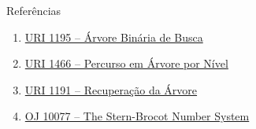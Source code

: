 \begin{frame}[fragile]{Referências}

    \begin{enumerate}
        \item \href{https://www.urionlinejudge.com.br/judge/pt/problems/view/1195}{URI 1195 -- Árvore Binária de Busca}

        \item \href{https://www.urionlinejudge.com.br/judge/pt/problems/view/1466}{URI 1466 -- Percurso em Árvore por Nível}

        \item \href{https://www.urionlinejudge.com.br/judge/pt/problems/view/1191}{URI 1191 -- Recuperação da Árvore}

        \item \href{https://onlinejudge.org/index.php?option=com_onlinejudge&Itemid=8&page=show_problem&problem=1018}{OJ 10077 -- The Stern-Brocot Number System}
    \end{enumerate}

\end{frame}
